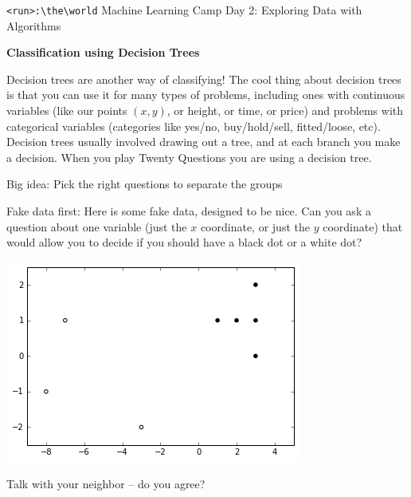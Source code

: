 \documentclass[10pt]{article}
\newcommand{\code}[1]{\colorbox{light-gray}{\texttt{#1}}}
\newcommand{\headerclass}{\code{<run>:\textbackslash the\textbackslash world} Machine Learning Camp}
\newcommand{\headersection}{Day 2: Exploring Data with Algorithms}
\newcommand{\headertitle}{Classification using Decision Trees}
\begin{document}
\headerclass\xspace {} \headersection\\
\begin{center}{ \large \textbf{\headertitle} }\end{center}



Decision trees are another way of classifying! The cool thing about decision trees is that you can use it for many types of problems, including ones with continuous variables (like our points $(x,y)$, or height, or time, or price) and problems with categorical variables (categories like yes/no, buy/hold/sell, fitted/loose, etc). 
	Decision trees usually involved drawing out a tree, and at each branch you make a decision. When you play Twenty Questions you are using a decision tree.
\bigskip
\begin{center}
Big idea: Pick the right questions to separate the groups
\end{center}
\bigskip
Fake data first:
	Here is some fake data, designed to be nice. Can you ask a question about one variable (just the $x$ coordinate, or just the $y$ coordinate) that would allow you to decide if you should have a black dot or a white dot?

 
\begin{center}
\includegraphics{TwoClusters.png}
\end{center}

Talk with your neighbor -- do you agree?


\pagebreak
\end{document}
